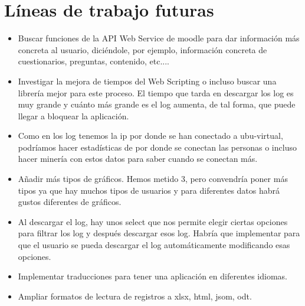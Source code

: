 \section{Líneas de trabajo futuras}\label{luxedneas-de-trabajo-futuras}

\begin{itemize}
	\tightlist
	\item
	Buscar funciones de la API Web Service de moodle para dar información más concreta al usuario, diciéndole, por ejemplo, información concreta de cuestionarios, preguntas, contenido, etc....
	\item
	Investigar la mejora de tiempos del Web Scripting o incluso buscar una librería mejor para este proceso. El tiempo que tarda en descargar los log es muy grande y cuánto más grande es el log aumenta, de tal forma, que puede llegar a bloquear la aplicación.
	\item
	Como en los log tenemos la ip por donde se han conectado a ubu-virtual, podríamos hacer estadísticas de por donde se conectan las personas o incluso hacer minería con estos datos para saber cuando se conectan más.
	\item
	Añadir más tipos de gráficos. Hemos metido 3, pero convendría poner más tipos ya que hay muchos tipos de usuarios y para diferentes datos habrá gustos diferentes de gráficos.
	\item
	Al descargar el log, hay unos select que nos permite elegir ciertas opciones para filtrar los log y después descargar esos log. Habría que implementar para que el usuario se pueda descargar el log automáticamente modificando esas opciones.
	\item
	Implementar traducciones para tener una aplicación en diferentes idiomas.
	\item
	Ampliar formatos de lectura de registros a xlsx, html, jsom, odt.
	
\end{itemize}
